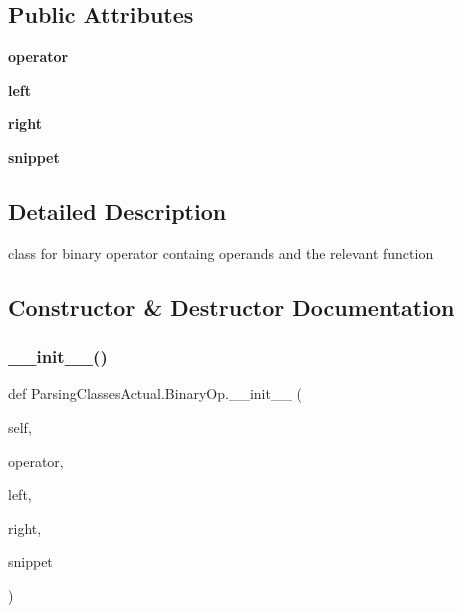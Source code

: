 \subsection*{Public Attributes}
\begin{DoxyCompactItemize}
\item 
\mbox{\label{class_parsing_classes_actual_1_1_binary_op_a4cd309c1dba26f392ccc0eec35713e36}} 
{\bfseries operator}
\item 
\mbox{\label{class_parsing_classes_actual_1_1_binary_op_ab5063aaba0e6111792dfc879ef0daf13}} 
{\bfseries left}
\item 
\mbox{\label{class_parsing_classes_actual_1_1_binary_op_af9b2ba232bcc0cf4ec48ad68b12572f2}} 
{\bfseries right}
\item 
\mbox{\label{class_parsing_classes_actual_1_1_binary_op_a794e13c741129c2da81d9845b41e0df8}} 
{\bfseries snippet}
\end{DoxyCompactItemize}


\subsection{Detailed Description}
class for binary operator containg operands and the relevant function 

\subsection{Constructor \& Destructor Documentation}
\mbox{\label{class_parsing_classes_actual_1_1_binary_op_a3d8482575f41d191640a397be6806991}} 
\subsubsection{\texorpdfstring{\+\_\+\+\_\+init\+\_\+\+\_\+()}{\_\_init\_\_()}}
{\footnotesize\ttfamily def Parsing\+Classes\+Actual.\+Binary\+Op.\+\_\+\+\_\+init\+\_\+\+\_\+ (\begin{DoxyParamCaption}\item[{}]{self,  }\item[{}]{operator,  }\item[{}]{left,  }\item[{}]{right,  }\item[{}]{snippet }\end{DoxyParamCaption})}



